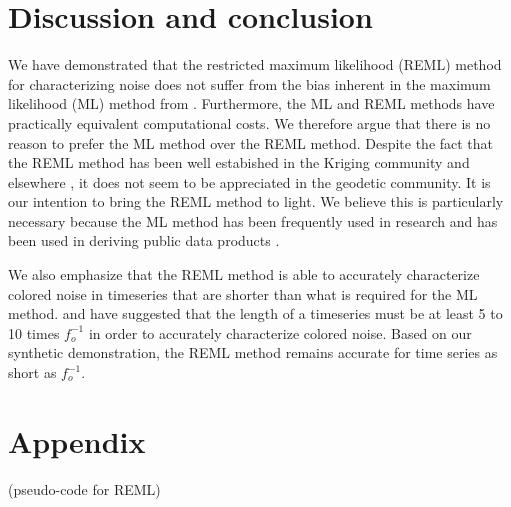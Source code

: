 \documentclass[10pt,a4paper]{article}
\begin{document}
\section{Discussion and conclusion}
We have demonstrated that the restricted maximum likelihood (REML) method for characterizing noise does not suffer from the bias inherent in the maximum likelihood (ML) method from \citet{Langbein1997}. Furthermore, the ML and REML methods have practically equivalent computational costs. We therefore argue that there is no reason to prefer the ML method over the REML method. Despite the fact that the REML method has been well estabished in the Kriging community and elsewhere \citep[e.g.][]{Wahba1985}, it does not seem to be appreciated in the geodetic community.  It is our intention to bring the REML method to light. We believe this is particularly necessary because the ML method has been frequently used in research and has been used in deriving public data products \citep[e.g.][]{Murray2017}. 

We also emphasize that the REML method is able to accurately characterize colored noise in timeseries that are shorter than what is required for the ML method. \citet{Langbein1997} and \citet{Langbein2012} have suggested that the length of a timeseries must be at least 5 to 10 times $f_o^{-1}$ in order to accurately characterize colored noise. Based on our synthetic demonstration, the REML method remains accurate for time series as short as $f_o^{-1}$.      

\section{Appendix}
(pseudo-code for REML)


  
\end{document}
